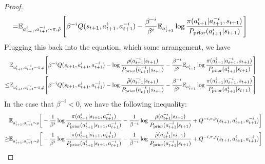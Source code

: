 \begin{proof}
\begin{equation*}
\begin{aligned}
    =& \mathbb{E}_{a^i_{t+1}, a^{-i}_{t+1} \sim \pi, \tilde{\rho}} \left[ \beta^{-i}Q(s_{t+1}, a^i_{t+1}, a^{-i}_{t+1}) - \frac{\beta^{-i}}{\beta^i} \mathbb{E}_{a^i_{t+1}}\log \frac{\pi(a^i_{t+1} | a^{-i}_{t+1}, s_{t+1})}{P_{\text{prior}}(a^i_{t+1} | s_{t+1})} \right]
\end{aligned}
\end{equation*}
Plugging this back into the equation, which some arrangement, we have 
\begin{equation*}
\begin{aligned}
&\begin{aligned}[t]
    \mathbb{E}_{a^i_{t+1}, a^{-i}_{t+1} \sim \pi, \rho}\Bigg[\beta^{-i}Q(s_{t+1}, a^i_{t+1}, a^{-i}_{t+1}) - \log\frac{\rho(a^{-i}_{t+1} | s_{t+1})}{P_{\text{prior}}(a^{-i}_{t+1} | s_{t+1})} - \frac{\beta^{-i}}{\beta^i} \mathbb{E}_{a^i_{t+1}}\log \frac{\pi(a^i_{t+1} | a^{-i}_{t+1}, s_{t+1})}{P_{\text{prior}}(a^i_{t+1} | s_{t+1})}\Bigg]
\end{aligned} \\
\le&\begin{aligned}[t]
    &\mathbb{E}_{a^i_{t+1}, a^{-i}_{t+1} \sim \pi, \tilde{\rho}}\Bigg[\beta^{-i}Q(s_{t+1}, a^i_{t+1}, a^{-i}_{t+1}) -\log\frac{\tilde{\rho}(a^{-i}_{t+1} | s_{t+1})}{P_{\text{prior}}(a^{-i}_{t+1} | s_{t+1})} - \frac{\beta^{-i}}{\beta^i} \mathbb{E}_{a^i_{t+1}}\log \frac{\pi(a^i_{t+1} | a^{-i}_{t+1}, s_{t+1})}{P_{\text{prior}}(a^i_{t+1} | s_{t+1})}\Bigg]
\end{aligned}
\end{aligned}
\end{equation*}
In the case that $\beta^{-i} < 0$, we have the following inequality:
\begin{equation*}
\begin{aligned}
    &\mathbb{E}_{a^i_{t+1}, a^{-i}_{t+1} \sim \rho}\bigg[-\frac{1}{\beta^i}\log \frac{\pi(a^i_{t+1} | s_{t+1}, a^{-i}_{t+1})}{P_{\text{prior}}(a^i_{t+1} | s_{t+1}, a^{-i}_{t+1})} - \frac{1}{\beta^{-i}}\log \frac{\rho(a^{-i}_{t+1} | s_{t+1})}{P_{\text{prior}}(a^{-i}_{t+1} | s_{t+1})} + Q^{-i, \pi, \rho}(s_{t+1}, a^i_{t+1}, a^{-i}_{t+1}) \bigg] \\
    \ge &\mathbb{E}_{a^i_{t+1}, a^{-i}_{t+1} \sim \tilde{\rho}}\bigg[-\frac{1}{\beta^i}\log \frac{\pi(a^i_{t+1} | s_{t+1}, a^{-i}_{t+1})}{P_{\text{prior}}(a^i_{t+1} | s_{t+1}, a^{-i}_{t+1})} - \frac{1}{\beta^{-i}}\log \frac{\tilde{\rho}(a^{-i}_{t+1} | s_{t+1})}{P_{\text{prior}}(a^{-i}_{t+1} | s_{t+1})} + Q^{-i, \pi, \rho}(s_{t+1}, a^i_{t+1}, a^{-i}_{t+1}) \bigg]
\end{aligned}
\end{equation*}

\end{proof}
